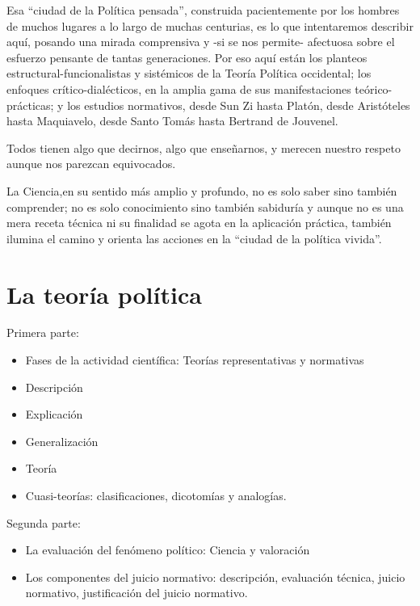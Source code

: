 \documentclass[
]{book}
\providecommand{\tightlist}{%
  \setlength{\itemsep}{0pt}\setlength{\parskip}{0pt}}
\begin{document}
Esa ``ciudad de la Política pensada'', construida pacientemente por los hombres de muchos lugares a lo largo de muchas centurias, es lo que intentaremos describir aquí, posando una mirada comprensiva y -si se nos permite- afectuosa sobre el esfuerzo pensante de tantas generaciones. Por eso aquí están los planteos estructural-funcionalistas y sistémicos de la Teoría Política occidental; los enfoques crítico-dialécticos, en la amplia gama de sus manifestaciones teórico-prácticas; y los estudios normativos, desde Sun Zi hasta Platón, desde Aristóteles hasta Maquiavelo, desde Santo Tomás hasta Bertrand de Jouvenel.

Todos tienen algo que decirnos, algo que enseñarnos, y merecen nuestro respeto aunque nos parezcan equivocados.

La Ciencia,en su sentido más amplio y profundo, no es solo saber sino también comprender; no es solo conocimiento sino también sabiduría y aunque no es una mera receta técnica ni su finalidad se agota en la aplicación práctica, también ilumina el camino y orienta las acciones en la ``ciudad de la política vivida''.

\hypertarget{Lateoruxedapoluxedtica}{%
\chapter{La teoría política}\label{Lateoruxedapoluxedtica}}

Primera parte:

\begin{itemize}
\tightlist
\item
  Fases de la actividad científica: Teorías representativas y normativas
\item
  Descripción
\item
  Explicación
\item
  Generalización
\item
  Teoría
\item
  Cuasi-teorías: clasificaciones, dicotomías y analogías.
\end{itemize}

Segunda parte:

\begin{itemize}
\tightlist
\item
  La evaluación del fenómeno político: Ciencia y valoración
\item
  Los componentes del juicio normativo: descripción, evaluación técnica, juicio normativo, justificación del juicio normativo.
\end{itemize}
\end{document}
